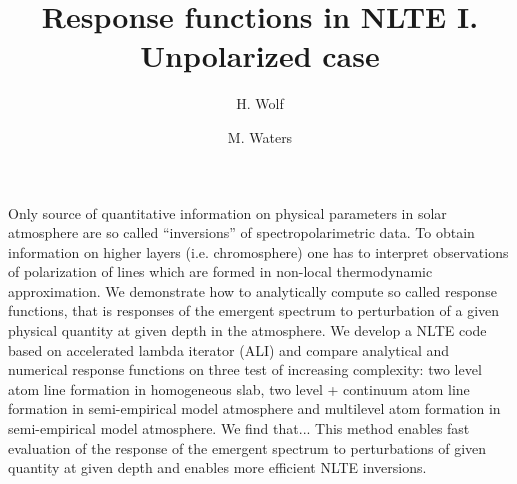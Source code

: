 \documentclass[referee]{aa}
\begin{document}
   \title{Response functions in NLTE I. Unpolarized case}

   \subtitle{}

   \author{H. Wolf
   \and
   M. Waters}
   

   \date{}


  \abstract
   {Only source of quantitative information on physical parameters in solar atmosphere are so called ``inversions'' of spectropolarimetric data. To obtain information on higher layers (i.e. chromosphere) one has to interpret observations of polarization of lines which are formed in non-local thermodynamic approximation.}
  {We demonstrate how to analytically compute so called response functions, that is responses of the emergent spectrum to perturbation of a given physical quantity at given depth in the atmosphere.}
   {We develop a NLTE code based on accelerated lambda iterator (ALI) and compare analytical and numerical response functions on three test of increasing complexity: two level atom line formation in homogeneous slab, two level + continuum atom line formation in semi-empirical model atmosphere and multilevel atom formation in semi-empirical model atmosphere. }
   {We find that... } 
   {This method enables fast evaluation of the response of the emergent spectrum to perturbations of given quantity at given depth and enables more efficient NLTE inversions.}


   \maketitle

\end{document}
